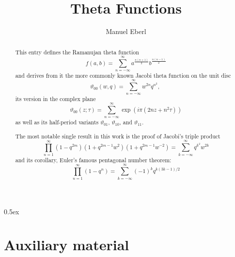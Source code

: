 \documentclass[11pt,a4paper]{article}
\begin{document}
\title{Theta Functions}
\author{Manuel Eberl}
\maketitle

\begin{abstract}
This entry defines the Ramanujan theta function
\[f(a,b) = \sum_{n=-\infty}^\infty a^{\frac{n(n+1)}{2}} b^{\frac{n(n-1)}{2}}\]
and derives from it the more commonly known Jacobi theta function on the unit disc
\[\vartheta_{00}(w,q) = \sum_{n=-\infty}^\infty w^{2n} q^{n^2},\ \]
its version in the complex plane
\[\vartheta_{00}(z;\tau) = \sum_{n=-\infty}^\infty \exp(i\pi (2nz + n^2\tau))\]
as well as its half-period variants $\vartheta_{01}$, $\vartheta_{10}$, and $\vartheta_{11}$.

The most notable single result in this work is the proof of Jacobi's triple product
\[\prod_{n=1}^\infty (1-q^{2m})(1+q^{2m-1}w^2)(1+q^{2m-1}w^{-2}) = 
  \sum_{k=-\infty}^\infty q^{k^2}w^{2k}\]
and its corollary, Euler's famous pentagonal number theorem:
\[\prod_{n=1}^\infty (1-q^n) = \sum_{k=-\infty}^\infty (-1)^k q^{k(3k-1)/2}\]
\end{abstract}

\newpage

\tableofcontents

\newpage
\parindent 0pt\parskip 0.5ex

\section{Auxiliary material}



\raggedright
\nocite{brent2020}
\nocite{borwein1987}



\end{document}
